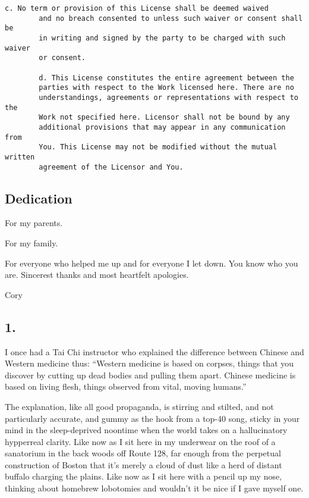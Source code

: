 \begin{Verbatim}[fontsize=\footnotesize]
        c. No term or provision of this License shall be deemed waived
        and no breach consented to unless such waiver or consent shall be
        in writing and signed by the party to be charged with such waiver
        or consent.
        
        d. This License constitutes the entire agreement between the
        parties with respect to the Work licensed here. There are no
        understandings, agreements or representations with respect to the
        Work not specified here. Licensor shall not be bound by any
        additional provisions that may appear in any communication from
        You. This License may not be modified without the mutual written
        agreement of the Licensor and You.

\end{Verbatim}

\subsection{Dedication}
{
\setlength{\parindent}{0pt}
\addtolength{\parskip}{0.5\baselineskip}

For my parents.

For my family.

For everyone who helped me up and for everyone I let down. You know
who you are. Sincerest thanks and most heartfelt apologies.

Cory
}

\subsection{1.}

I once had a Tai Chi instructor who explained the difference
between Chinese and Western medicine thus: “Western medicine is
based on corpses, things that you discover by cutting up dead
bodies and pulling them apart. Chinese medicine is based on living
flesh, things observed from vital, moving humans.”

The explanation, like all good propaganda, is stirring and stilt\-ed,
and not particularly accurate, and gummy as the hook from a top-40
song, sticky in your mind in the sleep-deprived noontime when the
world takes on a hallucinatory hypperreal clarity. Like now as I
sit here in my underwear on the roof of a sanatorium in the back
woods off Route 128, far enough from the perpetual construction of
Boston that it’s merely a cloud of dust like a herd of distant
buffalo charging the plains. Like now as I sit here with a pencil
up my nose, thinking about homebrew lobotomies and wouldn’t it be
nice if I gave myself one.

